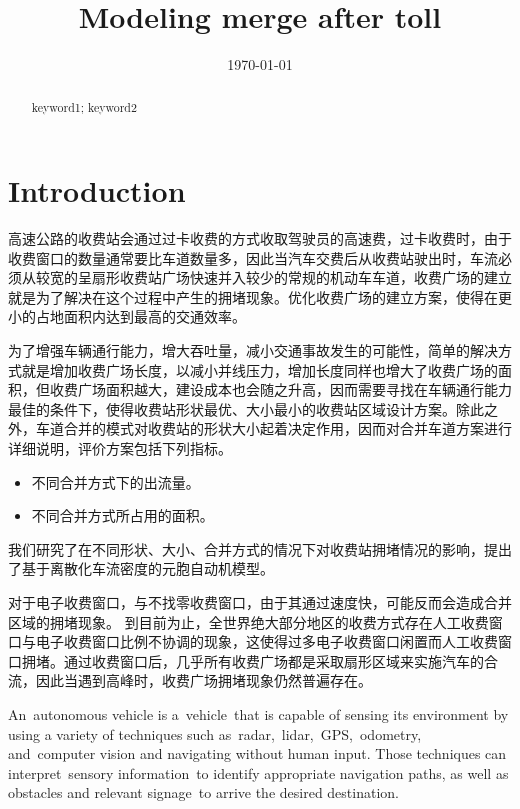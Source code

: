 \documentclass{mcmthesis}
\title{Modeling merge after toll}
\date{\today}
\begin{document}
\begin{abstract}
\lipsum[1]
\begin{keywords}
keyword1; keyword2
\end{keywords}
\end{abstract}
\maketitle
\tableofcontents
\newpage
\section{Introduction}
高速公路的收费站会通过过卡收费的方式收取驾驶员的高速费，过卡收费时，由于收费窗口的数量通常要比车道数量多，因此当汽车交费后从收费站驶出时，车流必须从较宽的呈扇形收费站广场快速并入较少的常规的机动车车道，收费广场的建立就是为了解决在这个过程中产生的拥堵现象。优化收费广场的建立方案，使得在更小的占地面积内达到最高的交通效率。


为了增强车辆通行能力，增大吞吐量，减小交通事故发生的可能性，简单的解决方式就是增加收费广场长度，以减小并线压力，增加长度同样也增大了收费广场的面积，但收费广场面积越大，建设成本也会随之升高，因而需要寻找在车辆通行能力最佳的条件下，使得收费站形状最优、大小最小的收费站区域设计方案。除此之外，车道合并的模式对收费站的形状大小起着决定作用，因而对合并车道方案进行详细说明，评价方案包括下列指标。

\begin{itemize}
	\item 不同合并方式下的出流量。
	\item  不同合并方式所占用的面积。
\end{itemize}

我们研究了在不同形状、大小、合并方式的情况下对收费站拥堵情况的影响，提出了基于离散化车流密度的元胞自动机模型。

对于电子收费窗口，与不找零收费窗口，由于其通过速度快，可能反而会造成合并区域的拥堵现象\cite{spiliopoulou2009toll}。
到目前为止，全世界绝大部分地区的收费方式存在人工收费窗口与电子收费窗口比例不协调的现象，这使得过多电子收费窗口闲置而人工收费窗口拥堵。通过收费窗口后，几乎所有收费广场都是采取扇形区域来实施汽车的合流，因此当遇到高峰时，收费广场拥堵现象仍然普遍存在。


An autonomous vehicle is a vehicle that is capable of sensing its environment by using a variety of techniques such as radar, lidar, GPS, odometry, and computer vision and navigating without human input. Those techniques can interpret sensory information to identify appropriate navigation paths, as well as obstacles and relevant signage to arrive the desired destination.\cite{wiki:autonomous}
\end{document}
